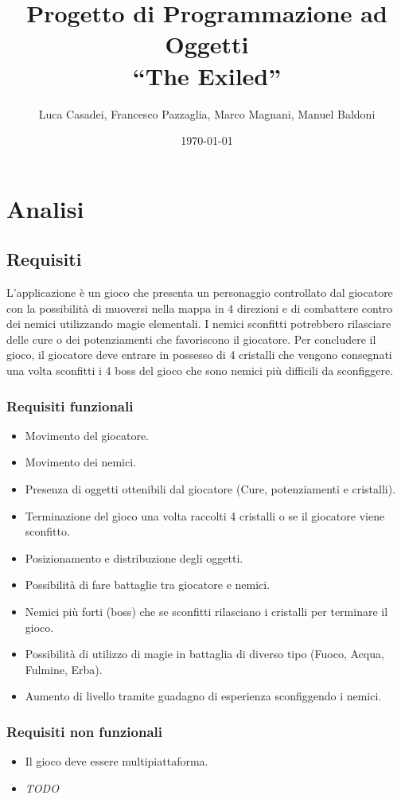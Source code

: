 \documentclass[a4paper,12pt]{report}
\title{Progetto di Programmazione ad Oggetti\\``The Exiled''}
\author{Luca Casadei, Francesco Pazzaglia, Marco Magnani, Manuel Baldoni}
\date{\today}
\begin{document}
\maketitle

\tableofcontents

\chapter{Analisi}

\section{Requisiti}
L'applicazione è un gioco che presenta un personaggio controllato dal giocatore con la possibilità di muoversi nella mappa in 4 direzioni e di combattere contro dei nemici utilizzando magie elementali. I nemici sconfitti potrebbero rilasciare delle cure o dei potenziamenti che favoriscono il giocatore. Per concludere il gioco, il giocatore deve entrare in possesso di 4 cristalli che vengono consegnati una volta sconfitti i 4 boss del gioco che sono nemici più difficili da sconfiggere.
\subsection*{Requisiti funzionali}
\begin{itemize}
    \item Movimento del giocatore.
    \item Movimento dei nemici.
    \item Presenza di oggetti ottenibili dal giocatore (Cure, potenziamenti e cristalli).
    \item Terminazione del gioco una volta raccolti 4 cristalli o se il giocatore viene sconfitto.
    \item Posizionamento e distribuzione degli oggetti.
    \item Possibilità di fare battaglie tra giocatore e nemici.
    \item Nemici più forti (boss) che se sconfitti rilasciano i cristalli per terminare il gioco.
    \item Possibilità di utilizzo di magie in battaglia di diverso tipo (Fuoco, Acqua, Fulmine, Erba).
    \item Aumento di livello tramite guadagno di esperienza sconfiggendo i nemici.
\end{itemize}

\subsection*{Requisiti non funzionali}
\begin{itemize}
    \item Il gioco deve essere multipiattaforma.
    \item \textit{TODO}
\end{itemize}
\end{document}
